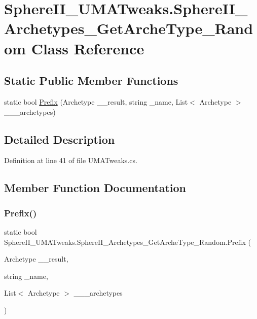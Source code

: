 \hypertarget{class_sphere_i_i___u_m_a_tweaks_1_1_sphere_i_i___archetypes___get_arche_type___random}{}\section{Sphere\+I\+I\+\_\+\+U\+M\+A\+Tweaks.\+Sphere\+I\+I\+\_\+\+Archetypes\+\_\+\+Get\+Arche\+Type\+\_\+\+Random Class Reference}
\label{class_sphere_i_i___u_m_a_tweaks_1_1_sphere_i_i___archetypes___get_arche_type___random}
\subsection*{Static Public Member Functions}
\begin{DoxyCompactItemize}
\item 
static bool \mbox{\hyperlink{class_sphere_i_i___u_m_a_tweaks_1_1_sphere_i_i___archetypes___get_arche_type___random_acd1daceab322a16fef983ef0153be147}{Prefix}} (Archetype \+\_\+\+\_\+result, string \+\_\+name, List$<$ Archetype $>$ \+\_\+\+\_\+\+\_\+archetypes)
\end{DoxyCompactItemize}


\subsection{Detailed Description}


Definition at line 41 of file U\+M\+A\+Tweaks.\+cs.



\subsection{Member Function Documentation}
\mbox{\label{class_sphere_i_i___u_m_a_tweaks_1_1_sphere_i_i___archetypes___get_arche_type___random_acd1daceab322a16fef983ef0153be147}} 
\subsubsection{\texorpdfstring{Prefix()}{Prefix()}}
{\footnotesize\ttfamily static bool Sphere\+I\+I\+\_\+\+U\+M\+A\+Tweaks.\+Sphere\+I\+I\+\_\+\+Archetypes\+\_\+\+Get\+Arche\+Type\+\_\+\+Random.\+Prefix (\begin{DoxyParamCaption}\item[{Archetype}]{\+\_\+\+\_\+result,  }\item[{string}]{\+\_\+name,  }\item[{List$<$ Archetype $>$}]{\+\_\+\+\_\+\+\_\+archetypes }\end{DoxyParamCaption})\hspace{0.3cm}{\ttfamily [static]}}



